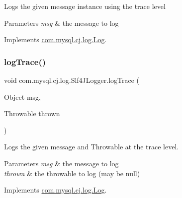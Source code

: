 Logs the given message instance using the \textquotesingle{}trace\textquotesingle{} level


\begin{DoxyParams}{Parameters}
{\em msg} & the message to log \\
\hline
\end{DoxyParams}


Implements \mbox{\hyperlink{interfacecom_1_1mysql_1_1cj_1_1log_1_1_log_a04f51d4b9464df28c94695ae8159440e}{com.\+mysql.\+cj.\+log.\+Log}}.

\mbox{\label{classcom_1_1mysql_1_1cj_1_1log_1_1_slf4_j_logger_aa93d48c2e1172db2949b2ac64e58052a}} 
\subsubsection{\texorpdfstring{log\+Trace()}{logTrace()}\hspace{0.1cm}{\footnotesize\ttfamily [2/2]}}
{\footnotesize\ttfamily void com.\+mysql.\+cj.\+log.\+Slf4\+J\+Logger.\+log\+Trace (\begin{DoxyParamCaption}\item[{Object}]{msg,  }\item[{Throwable}]{thrown }\end{DoxyParamCaption})}

Logs the given message and Throwable at the \textquotesingle{}trace\textquotesingle{} level.


\begin{DoxyParams}{Parameters}
{\em msg} & the message to log \\
\hline
{\em thrown} & the throwable to log (may be null) \\
\hline
\end{DoxyParams}


Implements \mbox{\hyperlink{interfacecom_1_1mysql_1_1cj_1_1log_1_1_log_aa93fa5550a3152afd64479adca676200}{com.\+mysql.\+cj.\+log.\+Log}}.

\mbox{\label{classcom_1_1mysql_1_1cj_1_1log_1_1_slf4_j_logger_a9b6bd04f7179ae6e572fb9ac91ade49e}} 
